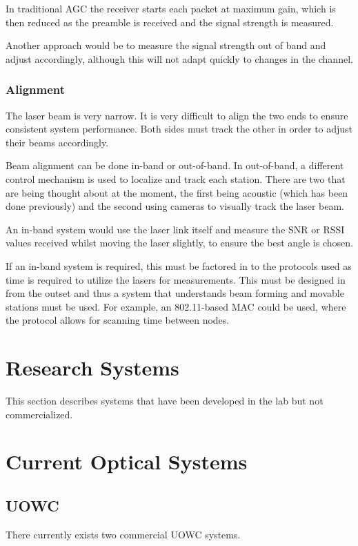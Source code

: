 \documentclass{article}
\begin{document}
In traditional \ac{AGC} the receiver starts each packet at maximum gain, which is then reduced as the preamble is received and the signal strength is measured.

Another approach would be to measure the signal strength out of band and adjust accordingly, although this will not adapt quickly to changes in the channel.

\subsubsection{Alignment}
The laser beam is very narrow. It is very difficult to align the two ends to ensure consistent system performance. Both sides must track the other in order to adjust their beams accordingly.

Beam alignment can be done in-band or out-of-band. In out-of-band, a different control mechanism is used to localize and track each station. There are two that are being thought about at the moment, the first being acoustic (which has been done previously) and the second using cameras to visually track the laser beam.

An in-band system would use the laser link itself and measure the \ac{SNR} or \ac{RSSI} values received whilst moving the laser slightly, to ensure the best angle is chosen.

If an in-band system is required, this must be factored in to the protocols used as time is required to utilize the lasers for measurements. This must be designed in from the outset and thus a system that understands beam forming and movable stations must be used. For example, an 802.11-based \ac{MAC} could be used, where the protocol allows for scanning time between nodes.

\section{Research Systems}
This section describes systems that have been developed in the lab but not commercialized.

\subsection{}

\section{Current Optical Systems}
\subsection{\ac{UOWC}}
There currently exists two commercial \ac{UOWC} systems.
\end{document}
